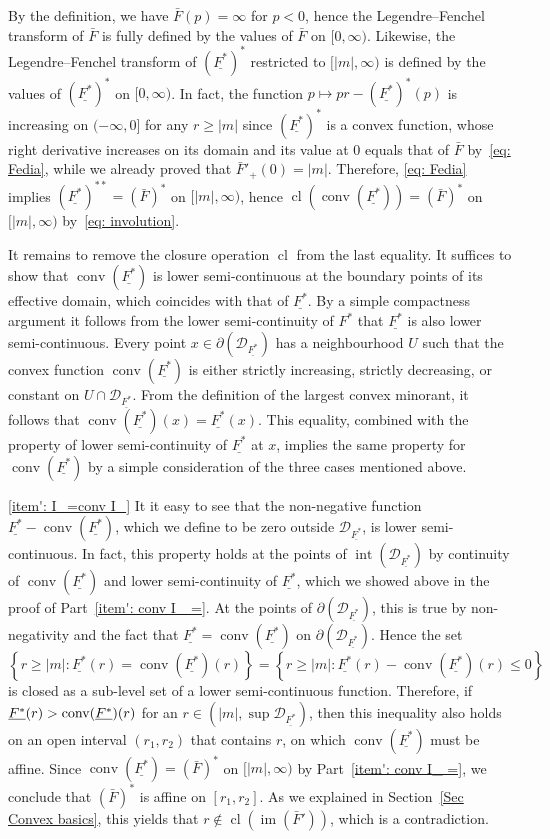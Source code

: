 \documentclass[AHL,Unicode,published]{cedram}
\DeclareMathOperator{\conv}{conv}
\DeclareMathOperator{\im}{im}
\DeclareMathOperator{\cl}{cl}
\DeclareMathOperator{\intr}{int}
\newcommand{\ubar}[1]{\underline{#1}}
\newcommand{\Dcl}{\mathcal{D}}
\begin{document}
\begin{proofc}
By the definition, we have $\bar F(p)=\infty$ for $p<0$, hence the Legendre--Fenchel transform of $\bar F$ is fully defined by the values of $\bar F$ on $[0, \infty)$. Likewise, the Legendre--Fenchel transform of $(\ubar{F^*})^*$ restricted to $[|m|, \infty)$ is defined by the values of $(\ubar{F^*})^*$ on $[0, \infty)$. In fact, the function $p \mapsto pr - (\ubar{F^*})^*(p)$ is increasing on $(-\infty, 0]$ for any $r \ge |m|$ since $(\ubar{F^*})^*$ is a convex function, whose right derivative increases on its domain and its value at $0$ equals that of $\bar F$ by~\eqref{eq: Fedia}, while we already proved that $\bar F'_+(0)=|m|$. Therefore, \eqref{eq: Fedia} implies $(\ubar{F^*})^{**} = (\bar F)^*$ on $[|m|, \infty)$, hence $\cl (\conv(\ubar{F^*}))= (\bar F)^*$ on $[|m|, \infty)$ by~\eqref{eq: involution}.

It remains to remove the closure operation $\cl$ from the last equality. It suffices to show that $\conv(\ubar{F^*})$ is lower semi-continuous at the boundary points of its effective domain, which coincides with that of $\ubar{F^*}$. By a simple compactness argument it follows from the lower semi-continuity of $F^*$ that $\ubar{F^*}$ is also lower semi-continuous. Every point $x \in \partial (\Dcl_{\ubar {F^*}})$ has a neighbourhood $U$ such that the convex function $\conv(\ubar{F^*})$ is either strictly increasing, strictly decreasing, or constant on $U \cap \Dcl_{\ubar {F^*}}$. From the definition of the largest convex minorant, it follows that $\conv(\ubar{F^*})(x)= \ubar{F^*}(x)$. This equality, combined with the property of lower semi-continuity of $\ubar{F^*}$ at $x$, implies the same property for $\conv(\ubar{F^*})$ by a simple consideration of the three cases mentioned above.

\eqref{item': I_=conv I_} It it easy to see that the non-negative function $\ubar {F^*} - \conv (\ubar {F^*})$, which we define to be zero outside $\Dcl_{\ubar {F^*}}$, is lower semi-continuous. In fact, this property holds at the points of $\intr (\Dcl_{\ubar {F^*}})$ by continuity of $\conv (\ubar {F^*})$ and lower semi-continuity of $\ubar {F^*}$, which we showed above in the proof of Part~\eqref{item': conv I_ =}. At the points of $\partial (\Dcl_{\ubar {F^*}})$, this is true by non-negativity and the fact that $\ubar {F^*} = \conv (\ubar {F^*})$ on $\partial (\Dcl_{\ubar {F^*}})$. Hence the set
\[
\left\{r \ge |m|: \ubar {F^*}(r) = \conv (\ubar {F^*})(r)\right\} = \left\{r \ge |m|: \ubar {F^*}(r) -\conv (\ubar {F^*})(r) \le 0\right\}
\]
is closed as a sub-level set of a lower semi-continuous function. Therefore, if $\ubar {F^*}(r)\linebreak >\conv (\ubar {F^*})(r)$ for an $r \in (|m|, \sup \Dcl_{\ubar {F^*}})$, then this inequality also holds on an open interval $(r_1, r_2)$ that contains $r$, on which $\conv (\ubar {F^*})$ must be affine. Since $\conv (\ubar {F^*})=(\bar F)^*$ on $[|m|, \infty)$ by Part~\eqref{item': conv I_ =}, we conclude that $(\bar F)^*$ is affine on $[r_1, r_2]$. As we explained in Section~\ref{Sec Convex basics}, this yields that $r \not \in \cl(\im(\bar F'))$, which is a contradiction.


\end{proofc}
\end{document}
